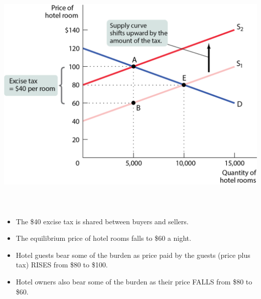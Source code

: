 \documentclass[
  ignorenonframetext,
]{beamer}
\providecommand{\tightlist}{%
  \setlength{\itemsep}{0pt}\setlength{\parskip}{0pt}}
\begin{document}
\begin{frame}{}
\protect\hypertarget{section-6}{}
\includegraphics[width=\textwidth,height=4.6875in]{figures/fig14_2.png}
\end{frame}

\begin{frame}{}
\protect\hypertarget{section-7}{}
\begin{itemize}
\tightlist
\item
  The \$40 excise tax is shared between buyers and sellers.
\item
  The equilibrium price of hotel rooms falls to \$60 a night.
\item
  Hotel guests bear some of the burden as price paid by the guests
  (price plus tax) RISES from \$80 to \$100.
\item
  Hotel owners also bear some of the burden as their price FALLS from
  \$80 to \$60.
\end{itemize}
\end{frame}
\end{document}
